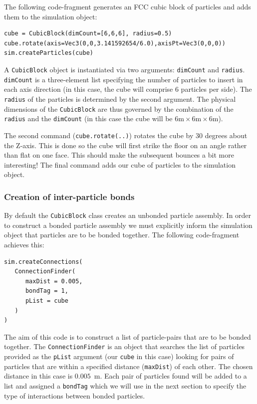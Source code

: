 The following code-fragment generates an FCC cubic block of particles and adds them to the simulation object:

\begin{verbatim}
cube = CubicBlock(dimCount=[6,6,6], radius=0.5)
cube.rotate(axis=Vec3(0,0,3.141592654/6.0),axisPt=Vec3(0,0,0))
sim.createParticles(cube)
\end{verbatim}

\noindent A \texttt{CubicBlock} object is instantiated via two arguments: \texttt{dimCount} and \texttt{radius}. \texttt{dimCount} is a three-element list specifying the number of particles to insert in each axis direction (in this case, the cube will comprise 6 particles per side). The \texttt{radius} of the particles is determined by the second argument. The physical dimensions of the \texttt{CubicBlock} are thus governed by the combination of the \texttt{radius} and the \texttt{dimCount} (in this case the cube will be $6\mathrm{m} \times 6\mathrm{m} \times 6\mathrm{m}$).

The second command (\texttt{cube.rotate(..)}) rotates the cube by 30 degrees about the Z-axis. This is done so the cube will first strike the floor on an angle rather than flat on one face. This should make the subsequent bounces a bit more interesting! The final command adds our cube of particles to the simulation object.

\subsubsection{Creation of inter-particle bonds}

By default the \texttt{CubicBlock} class creates an unbonded particle assembly. In order to construct a bonded particle assembly we must explicitly inform the simulation object that particles are to be bonded together. The following code-fragment achieves this:

\begin{verbatim}
sim.createConnections(
   ConnectionFinder(
      maxDist = 0.005,
      bondTag = 1,
      pList = cube
   )
)
\end{verbatim}

\noindent
The aim of this code is to construct a list of particle-pairs that are to be bonded together. The \texttt{ConnectionFinder} is an object that searches the list of particles provided as the \texttt{pList} argument (our \texttt{cube} in this case) looking for pairs of particles that are within a  specified distance (\texttt{maxDist}) of each other. The chosen distance in this case is $0.005$~m. Each pair of particles found will be added to a list and assigned a \texttt{bondTag} which we will use in the next section to specify the type of interactions between bonded particles.


